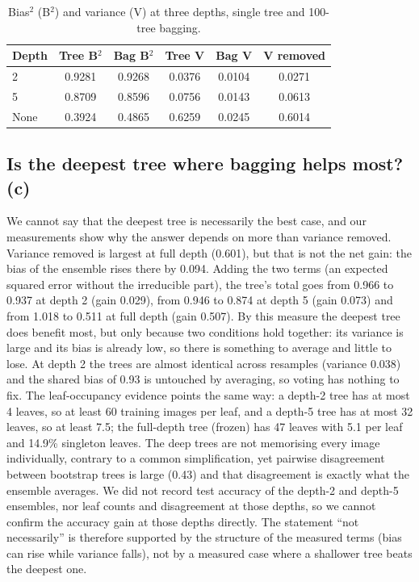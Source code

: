 \documentclass[10pt,twocolumn,letterpaper]{article}
\begin{document}
\begin{table}[t]
\centering\small
\setlength{\tabcolsep}{3pt}
\begin{tabular}{@{}lccccc@{}}
\toprule
Depth & Tree B$^2$ & Bag B$^2$ & Tree V & Bag V & V removed\\
\midrule
2 & 0.9281 & 0.9268 & 0.0376 & 0.0104 & 0.0271\\
5 & 0.8709 & 0.8596 & 0.0756 & 0.0143 & 0.0613\\
None & 0.3924 & 0.4865 & 0.6259 & 0.0245 & 0.6014\\
\bottomrule
\end{tabular}
\caption{Bias$^2$ (B$^2$) and variance (V) at three depths, single tree and 100-tree bagging.}
\label{tab:q3b}
\end{table}

\subsection{Is the deepest tree where bagging helps most? (c)}
We cannot say that the deepest tree is necessarily the best case, and our measurements show why the answer depends on more than variance removed. Variance removed is largest at full depth (0.601), but that is not the net gain: the bias of the ensemble rises there by 0.094. Adding the two terms (an expected squared error without the irreducible part), the tree's total goes from 0.966 to 0.937 at depth 2 (gain 0.029), from 0.946 to 0.874 at depth 5 (gain 0.073) and from 1.018 to 0.511 at full depth (gain 0.507). By this measure the deepest tree does benefit most, but only because two conditions hold together: its variance is large and its bias is already low, so there is something to average and little to lose. At depth 2 the trees are almost identical across resamples (variance 0.038) and the shared bias of 0.93 is untouched by averaging, so voting has nothing to fix. The leaf-occupancy evidence points the same way: a depth-2 tree has at most 4 leaves, so at least 60 training images per leaf, and a depth-5 tree has at most 32 leaves, so at least 7.5; the full-depth tree (frozen) has 47 leaves with 5.1 per leaf and 14.9\% singleton leaves. The deep trees are not memorising every image individually, contrary to a common simplification, yet pairwise disagreement between bootstrap trees is large (0.43) and that disagreement is exactly what the ensemble averages. We did not record test accuracy of the depth-2 and depth-5 ensembles, nor leaf counts and disagreement at those depths, so we cannot confirm the accuracy gain at those depths directly. The statement ``not necessarily'' is therefore supported by the structure of the measured terms (bias can rise while variance falls), not by a measured case where a shallower tree beats the deepest one.
\end{document}
